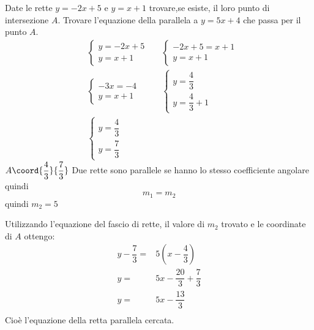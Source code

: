 	Date le rette $y=-2x+5$ e $y=x+1$ trovare,se esiste, il loro punto di intersezione $A$. Trovare l'equazione della parallela a $y=5x+4$ che passa per il punto $A$.
	\begin{align*}
	&\begin{cases}
	y=-2x+5\\
	y=x+1
	\end{cases}
	&&\begin{cases}
	-2x+5=x+1\\
	y=x+1
	\end{cases}\\
	&\begin{cases}
	-3x=-4\\
	y=x+1
	\end{cases}
	&&\begin{cases}
	y=\dfrac{4}{3}\\[.5em]
	y=\dfrac{4}{3}+1
	\end{cases}\\
	&\begin{cases}
y=\dfrac{4}{3}\\[.5em]
y=\dfrac{7}{3}
	\end{cases}
	\end{align*}
	$A\coord{\dfrac{4}{3}}{\dfrac{7}{3}}$
	Due rette sono parallele se hanno lo stesso coefficiente angolare quindi \[m_1=m_2 \]
	quindi $m_2=5$

	Utilizzando l'equazione del fascio di rette, il valore di $m_2$ trovato e le coordinate di $A$ ottengo:
	\begin{align*}
	y-\dfrac{7}{3}=&5(x-\dfrac{4}{3})\\
	y=&5x-\dfrac{20}{3}+\dfrac{7}{3}\\
	y=&5x-\dfrac{13}{3}\\
	\end{align*}
	Cioè l'equazione della retta parallela cercata.
	\begin{center}
		
	\end{center}

